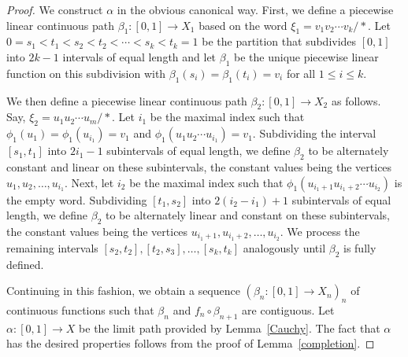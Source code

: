 \documentclass{amsart}
\theoremstyle{definition}
\theoremstyle{remark}
\numberwithin{equation}{section}
\begin{document}
\begin{proof} We construct $\alpha$ in the obvious canonical way.
First, we define a piecewise linear continuous path $\beta_1:[0,1]\rightarrow X_1$ based on
 the word $\xi_1=v_1v_2\cdots v_k/\ast$. Let
$0=s_1< t_1<s_2< t_2<\cdots<s_k< t_k=1$ be the partition that subdivides $[0,1]$ into $2k-1$ intervals of equal length and let $\beta_1$ be the unique piecewise linear function on this subdivision with $\beta_1(s_i)=\beta_1(t_i)=v_i$ for all $1\leqslant i \leqslant k$.

 We then define a piecewise linear continuous path $\beta_2:[0,1]\rightarrow X_2$ as follows. Say, $\xi_2=u_1u_2\cdots u_m/\ast$. Let $i_1$ be the maximal index such that $\phi_1(u_1)=\phi_1(u_{i_1})=v_1$ and $\phi_1(u_1u_2\cdots u_{i_1})=v_1$. Subdividing the interval $[s_1,t_1]$ into $2i_1-1$ subintervals of equal length, we define  $\beta_2$ to be alternately constant and linear on these subintervals, the constant values being the vertices $u_1,u_2,\dots, u_{i_1}$. Next,
 let $i_2$ be the maximal index such that $\phi_1(u_{i_1+1}u_{i_1+2}\cdots u_{i_2})$ is the empty word. Subdividing $[t_1,s_2]$ into $2(i_2-i_1)+1$ subintervals of equal length, we define $\beta_2$ to be alternately linear and constant on these subintervals, the constant values being the vertices $u_{i_1+1},u_{i_1+2},\dots, u_{i_2}$. We process the remaining intervals $[s_2,t_2],[t_2,s_3],\dots,[s_k,t_k]$ analogously until $\beta_2$ is fully defined.

Continuing in this fashion, we obtain a sequence $(\beta_n:[0,1]\rightarrow X_n)_n$ of continuous functions  such that $\beta_n$ and $f_n\circ \beta_{n+1}$ are contiguous. Let $\alpha:[0,1]\rightarrow X$ be the limit path provided by Lemma~\ref{Cauchy}. The fact that $\alpha$  has the desired properties follows from the proof of Lemma~\ref{completion}.
\end{proof}
\end{document}
